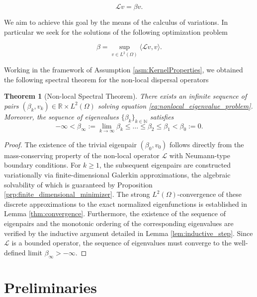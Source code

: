 \documentclass[11pt, a4paper]{article}
\theoremstyle{break}
\newtheorem{thm}{Theorem}[section]
\theoremstyle{break}
\theoremstyle{break}
\theoremstyle{break}
\theoremstyle{break}
\theoremstyle{break}
\theoremstyle{break}
\theoremstyle{break}
\theoremstyle{break}
\theoremstyle{break}
\begin{document}
\begin{equation}
    \label{eq:nonlocal_eigenvalue_problem}
    \mathcal{L} v = \beta v.
\end{equation}

We aim to achieve this goal by the means of the calculus of variations. In particular we seek for the solutions of the following optimization problem

\begin{equation}
    \beta = \sup_{v \in L^2(\Omega)} \langle \mathcal{L} v, v\rangle.
\end{equation}

Working in the framework of Assumption \ref{asm:KernelProperties}, we obtained the following spectral theorem for the non-local dispersal operators

\begin{thm}[Non-local Spectral Theorem]
\label{thm:spectral_theorem}
There exists an infinite sequence of pairs $(\beta_k, v_k) \in \mathbb{R} \times L^2(\Omega)$ solving equation \eqref{eq:nonlocal_eigenvalue_problem}. Moreover, the sequence of eigenvalues $\{\beta_k\}_{k \in \mathbb{N}}$ satisfies
\begin{equation}
    -\infty < \beta_\infty := \lim_{k\to\infty} \beta_k \le \dots \le \beta_2 \le \beta_1 < \beta_0 := 0.
\end{equation}
\end{thm}

\begin{proof}
The existence of the trivial eigenpair $(\beta_0, v_0)$ follows directly from the mass-conserving property of the non-local operator $\mathcal{L}$ with Neumann-type boundary conditions. For $k \ge 1$, the subsequent eigenpairs are constructed variationally via finite-dimensional Galerkin approximations, the algebraic solvability of which is guaranteed by Proposition \ref{prp:finite_dimensional_minimizer}. The strong $L^2(\Omega)$-convergence of these discrete approximations to the exact normalized eigenfunctions is established in Lemma \ref{thm:convergence}. Furthermore, the existence of the sequence of eigenpairs and the monotonic ordering of the corresponding eigenvalues are verified by the inductive argument detailed in Lemma \ref{lem:inductive_step}. Since $\mathcal{L}$ is a bounded operator, the sequence of eigenvalues must converge to the well-defined limit $\beta_\infty > -\infty$.
\end{proof}

\section{Preliminaries}
\end{document}
